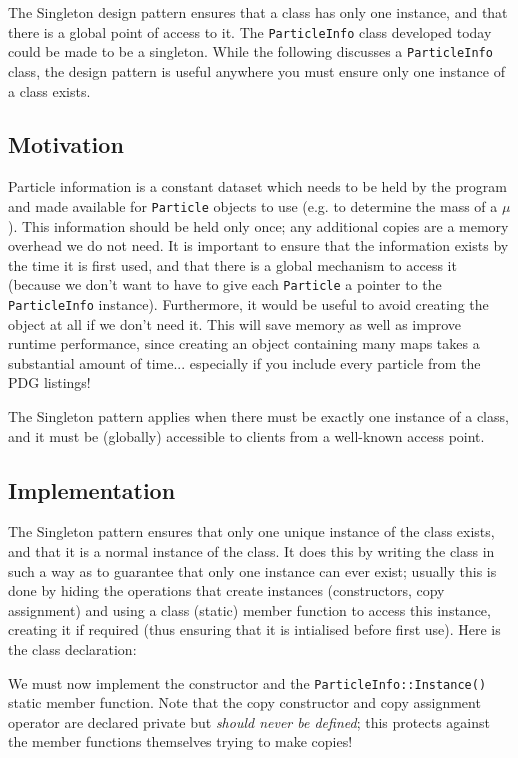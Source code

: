 \documentclass[a4paper]{scrartcl}
\begin{document}
The Singleton design pattern ensures that a class has only one instance, and that there is a global point of access to it. The \verb|ParticleInfo| class developed today could be made to be a singleton. While the following discusses a \verb|ParticleInfo| class, the design pattern is useful anywhere you must ensure only one instance of a class exists.

\subsection{Motivation}
Particle information is a constant dataset which needs to be held by the program and made available for \verb|Particle| objects to use (e.g. to determine the mass of a $\mu$). This information should be held only once; any additional copies are a memory overhead we do not need. It is important to ensure that the information exists by the time it is first used, and that there is a global mechanism to access it (because we don't want to have to give each \verb|Particle| a pointer to the \verb|ParticleInfo| instance). Furthermore, it would be useful to avoid creating the object at all if we don't need it. This will save memory as well as improve runtime performance, since creating an object containing many maps takes a substantial amount of time... especially if you include every particle from the PDG listings!

The Singleton pattern applies when there must be exactly one instance of a class, and it must be (globally) accessible to clients from a well-known access point.

\subsection{Implementation}
The Singleton pattern ensures that only one unique instance of the class exists, and that it is a normal instance of the class. It does this by writing the class in such a way as to guarantee that only one instance can ever exist; usually this is done by hiding the operations that create instances (constructors, copy assignment) and using a class (static) member function to access this instance, creating it if required (thus ensuring that it is intialised before first use). Here is the class declaration:



We must now implement the constructor and the \verb|ParticleInfo::Instance()| static member function. Note that the copy constructor and copy assignment operator are declared private but \emph{should never be defined}; this protects against the member functions themselves trying to make copies!
\end{document}
